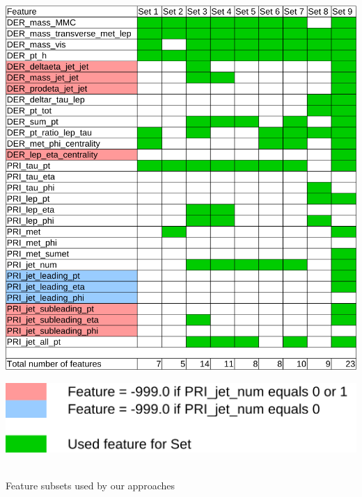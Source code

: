 \begin{table}
\begin{center}
\begin{minipage}{\textwidth}
	\includegraphics[width=\linewidth]{images/featsets}
	\vspace*{\baselineskip}
\end{minipage}
\begin{minipage}{.6\textwidth}
	\includegraphics[width=\linewidth]{images/featsets-legend}
\end{minipage}
\hspace{1em}
\begin{minipage}{.35\textwidth}
	\caption{\\Feature subsets used by our approaches}
	\label{tab:feats}	
\end{minipage}
\end{center}
\end{table}

